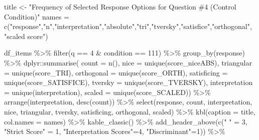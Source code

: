 \documentclass[
  letterpaper,
  DIV=11,
  numbers=noendperiod]{scrreprt}
\newenvironment{Shaded}{\begin{snugshade}}{\end{snugshade}}
\newcommand{\AttributeTok}[1]{\textcolor[rgb]{0.40,0.45,0.13}{#1}}
\newcommand{\DecValTok}[1]{\textcolor[rgb]{0.68,0.00,0.00}{#1}}
\newcommand{\FunctionTok}[1]{\textcolor[rgb]{0.28,0.35,0.67}{#1}}
\newcommand{\NormalTok}[1]{\textcolor[rgb]{0.00,0.23,0.31}{#1}}
\newcommand{\OtherTok}[1]{\textcolor[rgb]{0.00,0.23,0.31}{#1}}
\newcommand{\SpecialCharTok}[1]{\textcolor[rgb]{0.37,0.37,0.37}{#1}}
\newcommand{\StringTok}[1]{\textcolor[rgb]{0.13,0.47,0.30}{#1}}
\begin{document}
\begin{Shaded}
\begin{Highlighting}[]
\NormalTok{title }\OtherTok{\textless{}{-}} \StringTok{"Frequency of Selected Response Options for Question \#4 (Control Condition)"}
\NormalTok{names }\OtherTok{=} \FunctionTok{c}\NormalTok{(}\StringTok{"response"}\NormalTok{,}\StringTok{"n"}\NormalTok{,}\StringTok{"interpretation"}\NormalTok{,}\StringTok{"absolute"}\NormalTok{,}\StringTok{"tri"}\NormalTok{,}\StringTok{"tversky"}\NormalTok{,}\StringTok{"satisfice"}\NormalTok{,}\StringTok{"orthogonal"}\NormalTok{, }\StringTok{"scaled score"}\NormalTok{)}

\NormalTok{df\_items }\SpecialCharTok{\%\textgreater{}\%} \FunctionTok{filter}\NormalTok{(q }\SpecialCharTok{==} \DecValTok{4} \SpecialCharTok{\&}\NormalTok{ condition }\SpecialCharTok{==} \DecValTok{111}\NormalTok{) }\SpecialCharTok{\%\textgreater{}\%} \FunctionTok{group\_by}\NormalTok{(response) }\SpecialCharTok{\%\textgreater{}\%} 
\NormalTok{  dplyr}\SpecialCharTok{::}\FunctionTok{summarise}\NormalTok{( }\AttributeTok{count =} \FunctionTok{n}\NormalTok{(), }
                    \AttributeTok{nice =} \FunctionTok{unique}\NormalTok{(score\_niceABS),}
                    \AttributeTok{triangular =} \FunctionTok{unique}\NormalTok{(score\_TRI), }
                    \AttributeTok{orthogonal =}  \FunctionTok{unique}\NormalTok{(score\_ORTH),}
                    \AttributeTok{satisficing =}  \FunctionTok{unique}\NormalTok{(score\_SATISFICE),}
                    \AttributeTok{tversky =} \FunctionTok{unique}\NormalTok{(score\_TVERSKY),}
                    \AttributeTok{interpretation =} \FunctionTok{unique}\NormalTok{(interpretation),}
                    \AttributeTok{scaled =} \FunctionTok{unique}\NormalTok{(score\_SCALED)) }\SpecialCharTok{\%\textgreater{}\%} 
  \FunctionTok{arrange}\NormalTok{(interpretation, }\FunctionTok{desc}\NormalTok{(count)) }\SpecialCharTok{\%\textgreater{}\%} 
  \FunctionTok{select}\NormalTok{(response, count, interpretation, nice, }
\NormalTok{         triangular, tversky, satisficing, orthogonal, scaled) }\SpecialCharTok{\%\textgreater{}\%} 
  \FunctionTok{kbl}\NormalTok{(}\AttributeTok{caption =}\NormalTok{ title, }\AttributeTok{col.names =}\NormalTok{ names) }\SpecialCharTok{\%\textgreater{}\%}  \FunctionTok{kable\_classic}\NormalTok{() }\SpecialCharTok{\%\textgreater{}\%} 
  \FunctionTok{add\_header\_above}\NormalTok{(}\FunctionTok{c}\NormalTok{(}\StringTok{" "} \OtherTok{=} \DecValTok{3}\NormalTok{, }\StringTok{"Strict Score"} \OtherTok{=} \DecValTok{1}\NormalTok{, }\StringTok{"Interpretation Scores"}\OtherTok{=}\DecValTok{4}\NormalTok{, }\StringTok{"Discriminant"}\OtherTok{=}\DecValTok{1}\NormalTok{)) }\SpecialCharTok{\%\textgreater{}\%}

\end{Highlighting}
\end{Shaded}
\end{document}

